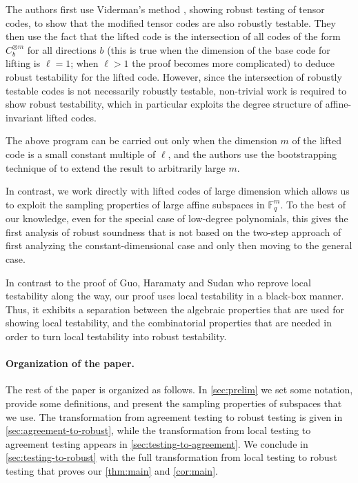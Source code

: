 \documentclass{toc}
\theoremstyle{plain}
\newcommand{\F}{{\mathbb{F}}}
\begin{document}
%
%
The authors first use Viderman's method \cite{Viderman2015}, %
showing robust testing of tensor codes, to show that the modified tensor codes are also robustly testable. They then use the fact that the lifted code is the intersection of all codes of the form $C^{\otimes m}_{b}$ for all directions $b$ (this is true when the dimension of the base code for lifting is $\ell=1$; when $\ell >1$ the proof becomes more complicated) to deduce robust testability for the lifted code. However, since
the  %
intersection of robustly testable codes is not necessarily robustly testable, %
non-trivial work is required to show robust testability, which in particular exploits the degree structure of affine-invariant lifted codes.

The above program can be carried out only when the dimension $m$ of the lifted code is a small constant multiple of $\ell$, and the authors use the
%
%
%
bootstrapping technique of
\cite{RubinfeldS1996,AroraLMSS1998,AroraS2003,Arora1994} 
to extend the result to
%
arbitrarily   %
large $m$.

In contrast, we work directly with lifted codes of large dimension which allows us to exploit the sampling  properties of large affine subspaces in $\F_q^m$. To the best of our knowledge, even for the special case of low-degree polynomials, this gives the first
analysis of robust soundness that  is not
based on the %
two-step   %
approach of first analyzing the
constant-dimensional %
case and only then moving to the general
%
case.

In contrast to the proof of Guo, Haramaty and Sudan \cite{GuoHS2015} 
who reprove  local testability %
along %
the way, our proof uses local testability in a black-box manner. Thus, it exhibits a separation between the algebraic properties that are used for showing local testability, and the combinatorial properties that  are needed in order to turn local testability into robust testability.

%
%
%
%

%
\paragraph{Organization of the paper.}  %
The rest of the paper is organized as follows. In \cref{sec:prelim} we set some notation, provide some definitions, and present the sampling properties of subspaces that we use. The transformation from agreement testing to robust testing is given in \cref{sec:agreement-to-robust}, while the transformation from local testing to agreement testing
%
appears  %
in \cref{sec:testing-to-agreement}.
We %
%
%
conclude in %
\cref{sec:testing-to-robust} with the full transformation
from local testing to robust testing that proves 
our \cref{thm:main} and \cref{cor:main}.
\end{document}
